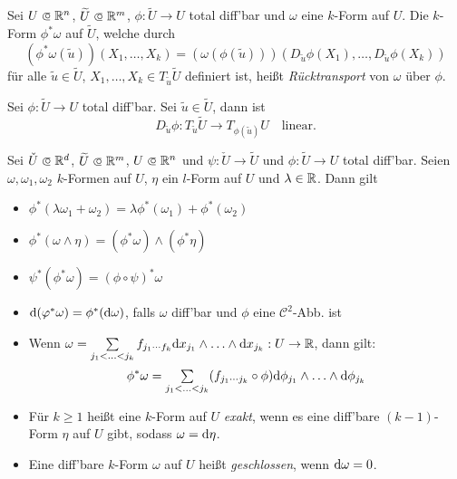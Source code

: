 \documentclass{cheat-sheet}
\newcommand{\Cont}{\mathcal{C}} %
\theoremstyle{definition}
\begin{document}
\begin{defn}
  Sei $U \opn \R^n$, $\widetilde{U} \opn \R^m$, $\phi : \widetilde{U} \to U$ total diff'bar und $\omega$ eine $k$-Form auf $U$. Die $k$-Form $\phi^* \omega$ auf $\widetilde{U}$, welche durch
  \[ (\phi^* \omega (\widetilde{u})) (X_1, \ldots, X_k) = (\omega (\phi(\widetilde{u})))(D_{\widetilde{u}} \phi (X_1), \ldots, D_{\widetilde{u}} \phi (X_k))  \]
  für alle $\widetilde{u} \in \widetilde{U}$, $X_1, \ldots, X_k \in T_{\widetilde{u}} \widetilde{U}$ definiert ist, heißt \emph{Rücktransport} von $\omega$ über $\phi$.
\end{defn}

\begin{anmerkung}
  Sei $\phi : \widetilde{U} \to U$ total diff'bar. Sei $\widetilde{u} \in \widetilde{U}$, dann ist
  \[ D_{\widetilde{u}} \phi : T_{\widetilde{u}} \widetilde{U} \to T_{\phi(\widetilde{u})} U \quad \text{linear}. \]
\end{anmerkung}

\begin{satz}

  Sei $\check{U} \opn \R^d$, $\widetilde{U} \opn \R^m$, $U \opn \R^n$ und $\psi : \check{U} \to \widetilde{U}$ und $\phi : \widetilde{U} \to U$ total diff'bar.
  Seien $\omega, \omega_1, \omega_2$ $k$-Formen auf $U$, $\eta$ ein $l$-Form auf $U$ und $\lambda \in \mathbb{R}$. Dann gilt

  \begin{itemize}
    \item $\phi^*(\lambda \omega_1 + \omega_2) = \lambda \phi^*(\omega_1) + \phi^*(\omega_2)$ 
    \item $\phi^*(\omega \wedge \eta) = (\phi^* \omega) \wedge (\phi^* \eta)$ 
    \item $\psi^*(\phi^* \omega) = (\phi \circ \psi)^* \omega$ 
    \item $\mathrm{d} (\varphi^* \omega) = \phi^* (\mathrm{d} \omega)$, falls $\omega$ diff'bar und $\phi$ eine $\Cont^2$-Abb. ist
    \item Wenn $\omega = \sum_{j_1 < \ldots < j_k} f_{j_1 \cdots f_k} \d x_{j_1} \wedge \ldots \wedge \d x_{j_k} : U \to \R$, dann gilt:
    \[ \phi^* \omega = \sum_{j_1 < \ldots < j_k} (f_{j_1 \cdots j_k} \circ \phi) \d \phi_{j_1} \wedge \ldots \wedge \d \phi_{j_k} \]
  \end{itemize}
\end{satz}

\begin{defn}
  \begin{itemize}
    \item Für $k \geq 1$ heißt eine $k$-Form auf $U$ \emph{exakt}, wenn es eine diff'bare $(k{-}1)$-Form $\eta$ auf $U$ gibt, sodass $\omega = \mathrm{d} \eta$.
    \item Eine diff'bare $k$-Form $\omega$ auf $U$ heißt \emph{geschlossen}, wenn $\mathrm{d} \omega = 0$.
  \end{itemize}
\end{defn}
\end{document}
